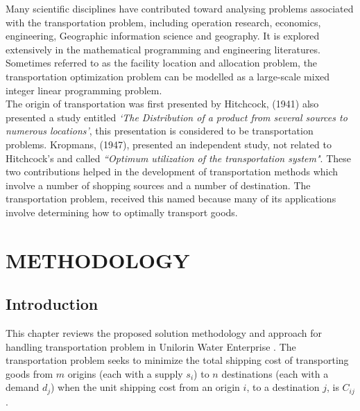 \documentclass[12pt]{report}
\newcommand{\NI}{\noindent}
\newcommand{\stp}{transportation problem }
\newcommand{\uwe}{Unilorin Water Enterprise }
\begin{document}
	\NI Many scientific disciplines have contributed toward analysing problems associated with the transportation problem, including operation research, economics, engineering, Geographic information science and geography. It is explored extensively in the mathematical programming and engineering literatures. Sometimes referred to as the facility location and allocation problem, the transportation optimization problem can be modelled as a large-scale mixed integer linear programming problem.\\
	
	\NI The origin of transportation was first presented by Hitchcock, (1941) also presented a study entitled \textit{`The Distribution of a product from several sources to numerous locations'}, this presentation is considered to be transportation problems. Kropmans, (1947), presented an independent study, not related to Hitchcock's and called \textit{``Optimum utilization of the transportation system"}. These two contributions helped in the development of transportation methods which involve a number of shopping sources and a number of destination. The transportation problem, received this named because many of its applications involve determining how to optimally transport goods.
	
	\chapter{METHODOLOGY}
	
	\section{Introduction}
	This chapter reviews the proposed solution methodology and approach for handling transportation problem in \uwe. The \stp seeks to minimize the total shipping cost of transporting goods from  $m$ origins (each with a supply $s_i$) to $n$ destinations (each with a demand $d_j$) when the unit shipping cost from an origin $i$, to a destination $j$, is $C_{ij}$.
	
\end{document}
